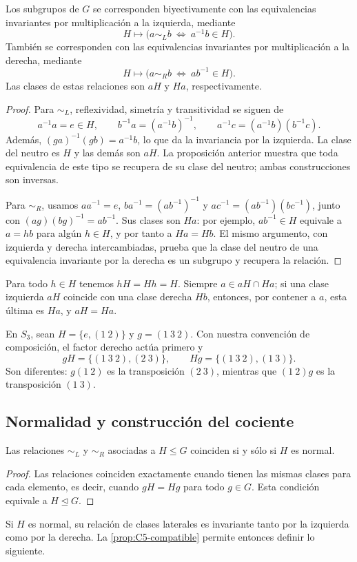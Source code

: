 \begin{prop}\label{prop:C5-correspondencias}
Los subgrupos de $G$ se corresponden biyectivamente con las equivalencias invariantes por multiplicación a la izquierda, mediante
\[
H\longmapsto\bigl(a\sim_L b\ \Longleftrightarrow\ a^{-1}b\in H\bigr).
\]
También se corresponden con las equivalencias invariantes por multiplicación a la derecha, mediante
\[
H\longmapsto\bigl(a\sim_R b\ \Longleftrightarrow\ ab^{-1}\in H\bigr).
\]
Las clases de estas relaciones son $aH$ y $Ha$, respectivamente.
\end{prop}
\begin{proof}
Para $\sim_L$, reflexividad, simetría y transitividad se siguen de
\[
a^{-1}a=e\in H,\qquad
b^{-1}a=(a^{-1}b)^{-1},\qquad
a^{-1}c=(a^{-1}b)(b^{-1}c).
\]
Además, $(ga)^{-1}(gb)=a^{-1}b$, lo que da la invariancia por la izquierda. La clase del neutro es $H$ y las demás son $aH$. La proposición anterior muestra que toda equivalencia de este tipo se recupera de su clase del neutro; ambas construcciones son inversas.

Para $\sim_R$, usamos $aa^{-1}=e$, $ba^{-1}=(ab^{-1})^{-1}$ y $ac^{-1}=(ab^{-1})(bc^{-1})$, junto con $(ag)(bg)^{-1}=ab^{-1}$. Sus clases son $Ha$: por ejemplo, $ab^{-1}\in H$ equivale a $a=hb$ para algún $h\in H$, y por tanto a $Ha=Hb$. El mismo argumento, con izquierda y derecha intercambiadas, prueba que la clase del neutro de una equivalencia invariante por la derecha es un subgrupo y recupera la relación.
\end{proof}
Para todo $h\in H$ tenemos $hH=Hh=H$. Siempre $a\in aH\cap Ha$; si una clase izquierda $aH$ coincide con una clase derecha $Hb$, entonces, por contener a $a$, esta última es $Ha$, y $aH=Ha$.

\begin{ejem}\label{ejem:C5-S3}
En $S_3$, sean $H=\{e,(1\ 2)\}$ y $g=(1\ 3\ 2)$. Con nuestra convención de composición, el factor derecho actúa primero y
\[
gH=\{(1\ 3\ 2),(2\ 3)\},\qquad
Hg=\{(1\ 3\ 2),(1\ 3)\}.
\]
Son diferentes: $g(1\ 2)$ es la transposición $(2\ 3)$, mientras que $(1\ 2)g$ es la transposición $(1\ 3)$.
\end{ejem}

\subsection{Normalidad y construcción del cociente}
\begin{prop}\label{prop:C5-normal-relaciones}
Las relaciones $\sim_L$ y $\sim_R$ asociadas a $H\le G$ coinciden si y sólo si $H$ es normal.
\end{prop}
\begin{proof}
Las relaciones coinciden exactamente cuando tienen las mismas clases para cada elemento, es decir, cuando $gH=Hg$ para todo $g\in G$. Esta condición equivale a $H\trianglelefteq G$.
\end{proof}
Si $H$ es normal, su relación de clases laterales es invariante tanto por la izquierda como por la derecha. La \cref{prop:C5-compatible} permite entonces definir lo siguiente.

